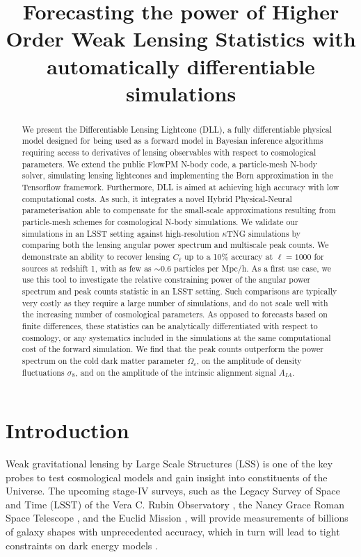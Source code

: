 \documentclass[twocolumn,twocolappendix]{aastex63}
\begin{document}
\title{Forecasting the power of Higher Order Weak Lensing Statistics with automatically differentiable simulations}


\begin{abstract}
We present the Differentiable Lensing Lightcone (DLL), a fully differentiable physical model designed for being used as a forward model in Bayesian inference algorithms requiring access to derivatives of lensing observables with respect to cosmological parameters. 
We extend the public FlowPM N-body code, a particle-mesh N-body solver, simulating lensing lightcones and implementing the Born approximation in the Tensorflow framework. Furthermore, DLL is aimed at achieving high accuracy with low computational costs. As such, it integrates a novel Hybrid Physical-Neural parameterisation able to compensate for the small-scale approximations resulting from particle-mesh schemes for cosmological N-body simulations.
We validate our simulations in an LSST setting against high-resolution $\kappa$TNG simulations by comparing both the lensing angular power spectrum and multiscale peak counts. We demonstrate an ability to recover lensing $C_\ell$ up to a 10\% accuracy at $\ell=1000$ for sources at redshift 1, with as few as $\sim 0.6$ particles per Mpc/h. 
As a first use case, we use this tool to investigate the relative constraining power of the angular power spectrum and peak counts statistic in an LSST setting.
Such comparisons are typically very costly as they require a large number of simulations, and do not scale well with the increasing number of cosmological parameters.  
As opposed to forecasts based on finite differences, these statistics can be analytically differentiated with respect to cosmology, or any systematics included in the simulations at the same computational cost of the forward simulation. We find that the peak counts outperform the power spectrum on the cold dark matter parameter $\Omega_c$, on the amplitude of density fluctuations $\sigma_8$, and on the
amplitude of the intrinsic alignment signal $A_{IA}$.
\end{abstract}





\section{Introduction}
Weak gravitational lensing by Large Scale Structures (LSS) is one of the key probes to test cosmological models and gain insight into constituents of the Universe. The upcoming stage-IV surveys, such as the Legacy Survey of Space and Time (LSST) of the Vera C. Rubin Observatory \citep{ivezic2019lsst}, the Nancy Grace Roman Space Telescope \citep{spergel2015wide}, and  the Euclid Mission \citep{laureijs2011euclid}, will provide measurements of billions of galaxy shapes with unprecedented accuracy, which in turn will lead to tight constraints on dark energy models \citep[e.g.][]{mandelbaum2018lsst}.
\end{document}
